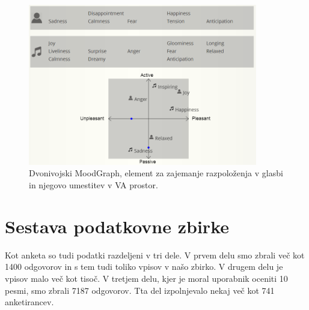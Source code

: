 \documentclass[a4paper, 12pt]{book}
\begin{document}
{\begin{figure}[htb]
\centering
\includegraphics[width=10cm]{images/moodgraphdvo.png}

\caption{Dvonivojski MoodGraph, element za zajemanje razpoloženja v glasbi in njegovo umestitev v VA prostor. }
\label{moodgraphdvo}
\end{figure}


\section{Sestava podatkovne zbirke}

Kot anketa so tudi podatki razdeljeni v tri dele. V prvem delu smo zbrali več kot 1400 odgovorov in s tem tudi toliko vpisov v našo zbirko. V drugem delu je vpisov malo več kot tisoč. V tretjem delu, kjer je moral uporabnik oceniti 10 pesmi, smo zbrali 7187 odgovorov. Tta del izpolnjevalo nekaj več kot 741 anketirancev.

}
\end{document}
